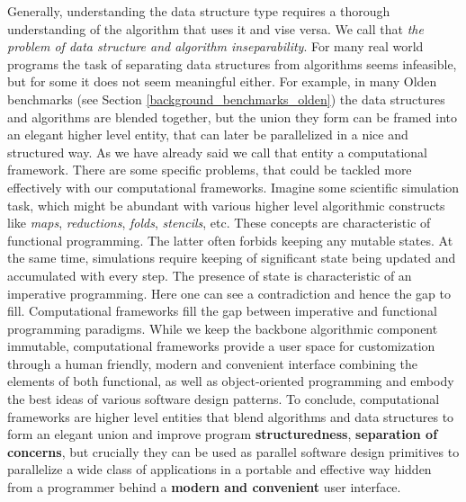 \quad Generally, understanding the data structure type requires a thorough understanding of the algorithm that uses it and vise versa. We call that \textit{the problem of data structure and algorithm inseparability}. For many real world programs the task of separating data structures from algorithms seems infeasible, but for some it does not seem meaningful either. For example, in many Olden benchmarks (see Section \ref{background_benchmarks_olden}) the data structures and algorithms are blended together, but the union they form can be framed into an elegant higher level entity, that can later be parallelized in a nice and structured way. As we have already said we call that entity a computational framework.\newline\null
\quad There are some specific problems, that could be tackled more effectively with our computational frameworks. Imagine some scientific simulation task, which might be abundant with various higher level algorithmic constructs like \textit{maps}, \textit{reductions}, \textit{folds}, \textit{stencils}, etc. These concepts are characteristic of functional programming. The latter often forbids keeping any mutable states. At the same time, simulations require keeping of significant state being updated and accumulated with every step. The presence of state is characteristic of an imperative programming. Here one can see a contradiction and hence the gap to fill. Computational frameworks fill the gap between imperative and functional programming paradigms. While we keep the backbone algorithmic component immutable, computational frameworks provide a user space for customization through a human friendly, modern and convenient interface combining the elements of both functional, as well as object-oriented programming and embody the best ideas of various software design patterns.\newline\null
\quad To conclude, computational frameworks are higher level entities that blend algorithms and data structures to form an elegant union and improve program \textbf{structuredness}, \textbf{separation of concerns}, but crucially they can be used as parallel software design primitives to parallelize a wide class of applications in a portable and effective way hidden from a programmer behind a \textbf{modern and convenient} user interface.
